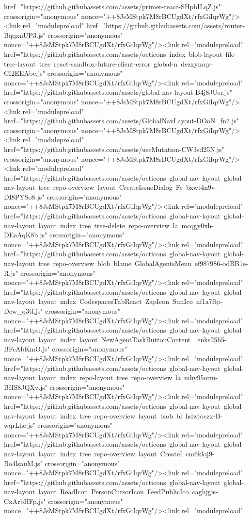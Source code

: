 href="https://github.githubassets.com/assets/primer-react-SHpbILqZ.js" crossorigin="anonymous" nonce="++8JsMStpk7M8rBCUgdXt/rfxGiIqrWg"/><link rel="modulepreload" href="https://github.githubassets.com/assets/router-BqqxnUP3.js" crossorigin="anonymous" nonce="++8JsMStpk7M8rBCUgdXt/rfxGiIqrWg"/><link rel="modulepreload" href="https://github.githubassets.com/assets/octicons~index~blob-layout~file-tree-layout~tree~react-sandbox-future-client-error~global-n~dezxymuy-CI2EEAbc.js" crossorigin="anonymous" nonce="++8JsMStpk7M8rBCUgdXt/rfxGiIqrWg"/><link rel="modulepreload" href="https://github.githubassets.com/assets/global-nav-layout-B4j8JUsr.js" crossorigin="anonymous" nonce="++8JsMStpk7M8rBCUgdXt/rfxGiIqrWg"/><link rel="modulepreload" href="https://github.githubassets.com/assets/GlobalNavLayout-DOoN_fn7.js" crossorigin="anonymous" nonce="++8JsMStpk7M8rBCUgdXt/rfxGiIqrWg"/><link rel="modulepreload" href="https://github.githubassets.com/assets/useMutation-CW3sd25N.js" crossorigin="anonymous" nonce="++8JsMStpk7M8rBCUgdXt/rfxGiIqrWg"/><link rel="modulepreload" href="https://github.githubassets.com/assets/octicons~global-nav-layout~global-nav-layout~tree~repo-overview~layout~CreateIssueDialog~Fe~bxwt4n9v-DI8PYSo8.js" crossorigin="anonymous" nonce="++8JsMStpk7M8rBCUgdXt/rfxGiIqrWg"/><link rel="modulepreload" href="https://github.githubassets.com/assets/octicons~global-nav-layout~global-nav-layout~layout~index~tree~tree-delete~repo-overview~la~mcqgy0xh-DEaAqK8b.js" crossorigin="anonymous" nonce="++8JsMStpk7M8rBCUgdXt/rfxGiIqrWg"/><link rel="modulepreload" href="https://github.githubassets.com/assets/octicons~global-nav-layout~global-nav-layout~tree~repo-overview~blob~blame~GlobalAgentsMenu~ef987986-odBB1e-R.js" crossorigin="anonymous" nonce="++8JsMStpk7M8rBCUgdXt/rfxGiIqrWg"/><link rel="modulepreload" href="https://github.githubassets.com/assets/octicons~global-nav-layout~global-nav-layout~layout~index~CodespacesTabReact~ZapIcon~SunIco~nf1a7ftp-Dcw_q3tf.js" crossorigin="anonymous" nonce="++8JsMStpk7M8rBCUgdXt/rfxGiIqrWg"/><link rel="modulepreload" href="https://github.githubassets.com/assets/octicons~global-nav-layout~global-nav-layout~layout~index~layout~NewAgentTaskButtonContent~~enks25b5-BFcAbKmO.js" crossorigin="anonymous" nonce="++8JsMStpk7M8rBCUgdXt/rfxGiIqrWg"/><link rel="modulepreload" href="https://github.githubassets.com/assets/octicons~global-nav-layout~global-nav-layout~layout~index~repo-layout~tree~repo-overview~la~mhy95orm-BHS8JQXv.js" crossorigin="anonymous" nonce="++8JsMStpk7M8rBCUgdXt/rfxGiIqrWg"/><link rel="modulepreload" href="https://github.githubassets.com/assets/octicons~global-nav-layout~global-nav-layout~layout~index~tree~repo-overview~layout~blob~bl~hdwjoczx-B-wqrLhe.js" crossorigin="anonymous" nonce="++8JsMStpk7M8rBCUgdXt/rfxGiIqrWg"/><link rel="modulepreload" href="https://github.githubassets.com/assets/octicons~global-nav-layout~global-nav-layout~layout~index~tree~repo-overview~layout~CreateI~cm6kloj9-Bo4lsauM.js" crossorigin="anonymous" nonce="++8JsMStpk7M8rBCUgdXt/rfxGiIqrWg"/><link rel="modulepreload" href="https://github.githubassets.com/assets/octicons~global-nav-layout~global-nav-layout~layout~ReadIcon~PersonCursorIcon~FeedPublicIco~caghjgis-CxArbHFp.js" crossorigin="anonymous" nonce="++8JsMStpk7M8rBCUgdXt/rfxGiIqrWg"/><link rel="modulepreload" 
